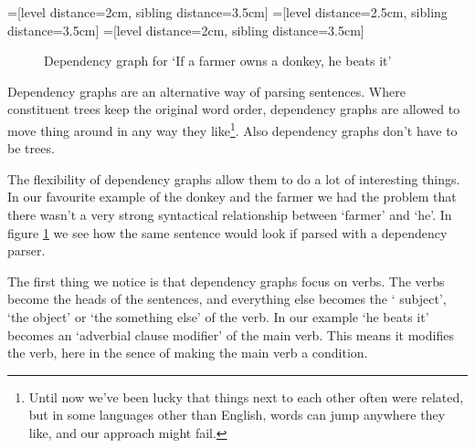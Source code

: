 \documentclass[12pt]{article}
\begin{document}
=[level distance=2cm, sibling distance=3.5cm]
=[level distance=2.5cm, sibling distance=3.5cm]
=[level distance=2cm, sibling distance=3.5cm]
\begin{figure}
\centering
{}
\caption{Dependency graph for `If a farmer owns a donkey, he beats it'} \label{fig:dependency_graph}
\end{figure}

Dependency graphs are an alternative way of parsing sentences. Where constituent trees keep the original word order, dependency graphs are allowed to move thing around in any way they like\footnote{Until now we've been lucky that things next to each other often were related, but in some languages other than English, words can jump anywhere they like, and our approach might fail.}. Also dependency graphs don't have to be trees.

The flexibility of dependency graphs allow them to do a lot of interesting things. In our favourite example of the donkey and the farmer we had the problem that there wasn't a very strong syntactical relationship between `farmer' and `he'. In figure \ref{fig:dependency_graph} we see how the same sentence would look if parsed with a dependency parser.

The first thing we notice is that dependency graphs focus on verbs. The verbs become the heads of the sentences, and everything else becomes the ` subject', `the object' or `the something else' of the verb. In our example `he beats it' becomes an `adverbial clause modifier' of the main verb. This means it modifies the verb, here in the sence of making the main verb a condition.
\end{document}
